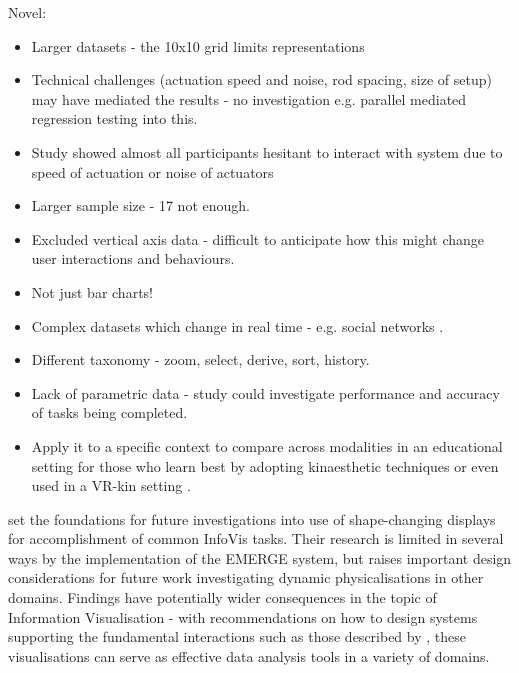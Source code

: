 \documentclass[11pt]{article}
\begin{document}
Novel:
\begin{itemize}
\item Larger datasets - the 10x10 grid limits representations
\item Technical challenges (actuation speed and noise, rod spacing, size of setup) may have mediated the results - no investigation e.g. parallel mediated regression testing into this.
\item Study showed almost all participants hesitant to interact with system due to speed of actuation or noise of actuators
\item Larger sample size - 17 not enough.
\item Excluded vertical axis data - difficult to anticipate how this might change user interactions and behaviours.
\item Not just bar charts!
\item Complex datasets which change in real time - e.g. social networks \citep{federico2011}.
\item Different taxonomy - zoom, select, derive, sort, history.
\item Lack of parametric data - study could investigate performance and accuracy of tasks being completed.
\item Apply it to a specific context to compare across modalities in an educational setting for those who learn best by adopting kinaesthetic techniques \citep{gilakjani2011} or even used in a VR-kin setting \citep{tennent2017}.
\end{itemize}

\citet{taher2015} set the foundations for future investigations into use of shape-changing displays for accomplishment of common InfoVis tasks. Their research is limited in several ways by the implementation of the EMERGE system, but raises important design considerations for future work investigating dynamic physicalisations in other domains. Findings have potentially wider consequences in the topic of Information Visualisation - with recommendations on how to design systems supporting the fundamental interactions such as those described by \citet{heer2012}, these visualisations can serve as effective data analysis tools in a variety of domains.


\newpage
\small

\normalsize
\end{document}
